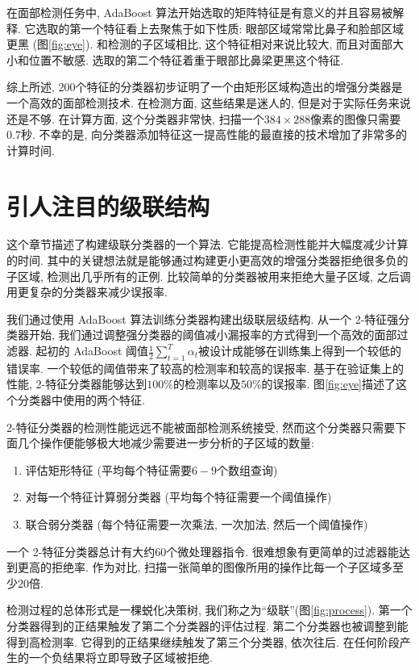 \documentclass[a4paper,utf8,11pt]{ctexart}
\begin{document}
在面部检测任务中, AdaBoost 算法开始选取的矩阵特征是有意义的并且容易被解释. 它选取的第一个特征看上去聚焦于如下性质: 眼部区域常常比鼻子和脸部区域更黑 (图\ref{fig:eye}). 和检测的子区域相比, 这个特征相对来说比较大, 而且对面部大小和位置不敏感. 选取的第二个特征着重于眼部比鼻梁更黑这个特征.

综上所述, $200$个特征的分类器初步证明了一个由矩形区域构造出的增强分类器是一个高效的面部检测技术. 在检测方面, 这些结果是迷人的, 但是对于实际任务来说还是不够. 在计算方面, 这个分类器非常快, 扫描一个$384\times288$像素的图像只需要$0.7$秒. 不幸的是, 向分类器添加特征这一提高性能的最直接的技术增加了非常多的计算时间.

\section{引人注目的级联结构}\label{sec:cascade}
这个章节描述了构建级联分类器的一个算法. 它能提高检测性能并大幅度减少计算的时间. 其中的关键想法就是能够通过构建更小更高效的增强分类器拒绝很多负的子区域, 检测出几乎所有的正例. 比较简单的分类器被用来拒绝大量子区域, 之后调用更复杂的分类器来减少误报率.

我们通过使用 AdaBoost 算法训练分类器构建出级联层级结构. 从一个 2-特征强分类器开始, 我们通过调整强分类器的阈值减小漏报率的方式得到一个高效的面部过滤器. 起初的 AdaBoost 阈值$\frac12\sum_{t=1}^T\alpha_t$被设计成能够在训练集上得到一个较低的错误率. 一个较低的阈值带来了较高的检测率和较高的误报率. 基于在验证集上的性能, 2-特征分类器能够达到$100\%$的检测率以及$50\%$的误报率. 图\ref{fig:eye}描述了这个分类器中使用的两个特征.

2-特征分类器的检测性能远远不能被面部检测系统接受, 然而这个分类器只需要下面几个操作便能够极大地减少需要进一步分析的子区域的数量:
\begin{enumerate}
\item 评估矩形特征 (平均每个特征需要$6-9$个数组查询)
\item 对每一个特征计算弱分类器 (平均每个特征需要一个阈值操作)
\item 联合弱分类器 (每个特征需要一次乘法, 一次加法, 然后一个阈值操作)
\end{enumerate}

一个 2-特征分类器总计有大约$60$个微处理器指令. 很难想象有更简单的过滤器能达到更高的拒绝率. 作为对比, 扫描一张简单的图像所用的操作比每一个子区域多至少$20$倍.

检测过程的总体形式是一棵蜕化决策树, 我们称之为``级联''\citep{quinlan1986induction}(图\ref{fig:process}). 第一个分类器得到的正结果触发了第二个分类器的评估过程. 第二个分类器也被调整到能得到高检测率. 它得到的正结果继续触发了第三个分类器, 依次往后. 在任何阶段产生的一个负结果将立即导致子区域被拒绝.
\end{document}
